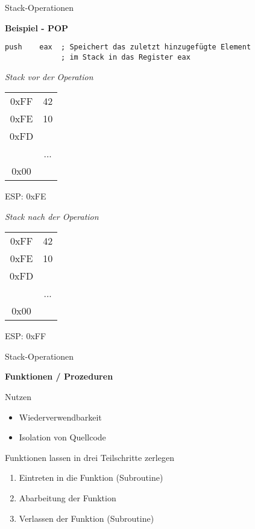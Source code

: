 \begin{frame}[fragile]{Stack-Operationen}

\begin{center}
\textbf{Beispiel - POP}
\end{center}

\begin{lstlisting}
push    eax  ; Speichert das zuletzt hinzugefügte Element
             ; im Stack in das Register eax
\end{lstlisting}

\begin{multicols}{2}

\begin{minipage}{5cm}
\emph{Stack vor der Operation}
\begin{tabular}{c|c|}
	\cline{2-2}
   0xFF & 42\\ \cline{2-2}
   0xFE & 10\\ \cline{2-2}
   0xFD & \\ \cline{2-2}
	      & ... \\ \cline{2-2}
	 0x00 & \\ \cline{2-2}
\end{tabular}
ESP: 0xFE
\end{minipage}

\begin{minipage}{5cm}
\emph{Stack nach der Operation}
\begin{tabular}{c|c|}
	\cline{2-2}
   0xFF & 42\\ \cline{2-2}
   0xFE & 10\\ \cline{2-2}
   0xFD & \\ \cline{2-2}
	      & ... \\ \cline{2-2}
	 0x00 & \\ \cline{2-2}
\end{tabular}
ESP: 0xFF
\end{minipage}
\end{multicols}
\end{frame}


\begin{frame}[fragile]{Stack-Operationen}

\begin{center}
\textbf{Funktionen / Prozeduren}
\end{center}

Nutzen \begin{itemize}
	\item Wiederverwendbarkeit 
	\item Isolation von Quellcode
\end{itemize}

\makebox{}

Funktionen lassen in drei Teilschritte zerlegen
\begin{enumerate}
	\item Eintreten in die Funktion (Subroutine)
	\item Abarbeitung der Funktion
	\item Verlassen der Funktion (Subroutine)
\end{enumerate}
\end{frame}

